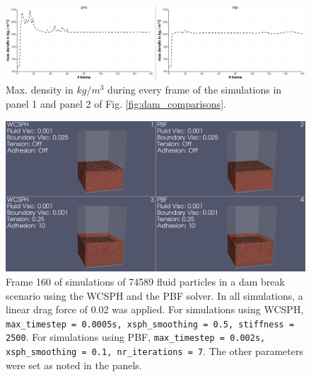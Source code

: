 \documentclass[11pt, letterpaper, twocolumn]{article}
\begin{document}
\begin{figure}
  \centering
  \includegraphics[width=\textwidth]{images/density_graphs.PNG}
  \caption{Max. density in $kg / m^3$ during every frame of the simulations in panel 1 and panel 2 of Fig. \ref{fig:dam_comparisons}.}
  \label{fig:max_densities}
\end{figure}

\begin{figure}
  \centering
  \includegraphics[width=\textwidth]{images/smallDam_XI_XII_tilted.0160.png}
  \caption{Frame 160 of simulations of 74589 fluid particles in a dam break scenario using the WCSPH and the PBF solver. In all simulations, a linear drag force of 0.02 was applied. For simulations using WCSPH, \texttt{max\_timestep = 0.0005s,
  xsph\_smoothing = 0.5, stiffness = 2500}. For simulations using PBF, \texttt{max\_timestep = 0.002s, xsph\_smoothing = 0.1, nr\_iterations = 7}. The other parameters were set as noted in the panels.}
  \label{fig:dam_comparisons_boundary_visc_adhesion}
\end{figure}
\end{document}
